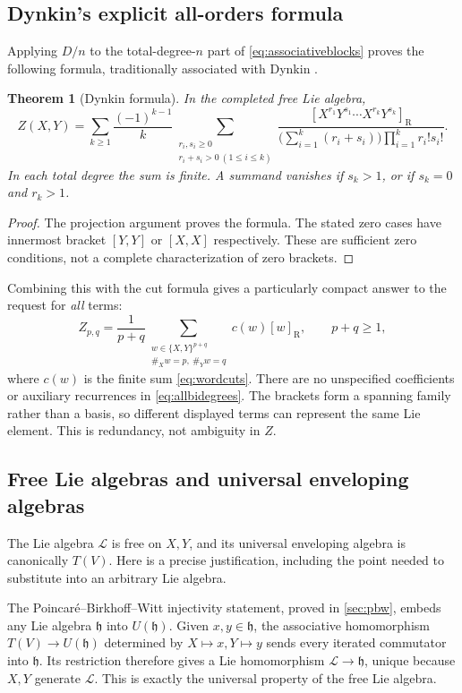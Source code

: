 \documentclass[11pt]{article}
\numberwithin{equation}{section}
\newtheorem{theorem}{Theorem}[section]
\theoremstyle{definition}
\theoremstyle{remark}
\newcommand{\h}{\mathfrak{h}}
\newcommand{\cL}{\mathcal{L}}
\newcommand{\RB}[1]{[#1]_{\mathrm R}}
\begin{document}
\subsection{Dynkin's explicit all-orders formula}
Applying $D/n$ to the total-degree-$n$ part of
\eqref{eq:associativeblocks} proves the following formula, traditionally
associated with Dynkin \cite{dynkin}.
\begin{theorem}[Dynkin formula]\label{thm:dynkin}
In the completed free Lie algebra,
\begin{equation}\label{eq:dynkin}
 \boxed{\displaystyle
 Z(X,Y)=\sum_{k\geq1}\frac{(-1)^{k-1}}k
 \sum_{\substack{r_i,s_i\geq0\\r_i+s_i>0\ (1\leq i\leq k)}}
 \frac{\RB{X^{r_1}Y^{s_1}\cdots X^{r_k}Y^{s_k}}}
 {\bigl(\sum_{i=1}^k(r_i+s_i)\bigr)\prod_{i=1}^k r_i!s_i!}.}
\end{equation}
In each total degree the sum is finite. A summand vanishes if
$s_k>1$, or if $s_k=0$ and $r_k>1$.
\end{theorem}
\begin{proof}
The projection argument proves the formula. The stated zero cases have
innermost bracket $[Y,Y]$ or $[X,X]$ respectively. These are sufficient
zero conditions, not a complete characterization of zero brackets.
\end{proof}
Combining this with the cut formula gives a particularly compact answer
to the request for \emph{all} terms:
\begin{equation}\label{eq:allbidegrees}
 \boxed{\displaystyle
 Z_{p,q}=\frac1{p+q}
 \sum_{\substack{w\in\{X,Y\}^{p+q}\\\#_Xw=p,\ \#_Yw=q}}
 c(w)\RB{w},\qquad p+q\geq1,}
\end{equation}
where $c(w)$ is the finite sum \eqref{eq:wordcuts}. There are no
unspecified coefficients or auxiliary recurrences in
\eqref{eq:allbidegrees}. The brackets form a spanning family rather than
a basis, so different displayed terms can represent the same Lie element.
This is redundancy, not ambiguity in $Z$.

\subsection{Free Lie algebras and universal enveloping algebras}
The Lie algebra $\cL$ is free on $X,Y$, and its universal enveloping
algebra is canonically $T(V)$. Here is a precise justification, including
the point needed to substitute into an arbitrary Lie algebra.

The Poincar\'e--Birkhoff--Witt injectivity statement, proved in
\cref{sec:pbw}, embeds any Lie algebra $\h$ into $U(\h)$. Given
$x,y\in\h$, the associative homomorphism $T(V)\to U(\h)$ determined
by $X\mapsto x,Y\mapsto y$ sends every iterated commutator into $\h$.
Its restriction therefore gives a Lie homomorphism $\cL\to\h$, unique
because $X,Y$ generate $\cL$. This is exactly the universal property
of the free Lie algebra.
\end{document}
